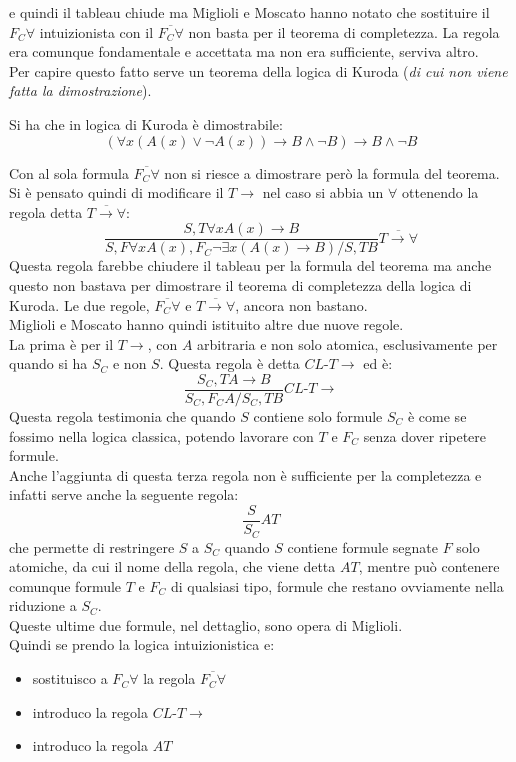 \documentclass[a4paper,12pt, oneside]{book}
\begin{document}
e quindi il tableau chiude ma Miglioli e Moscato hanno notato che sostituire il
$F_C\forall$ intuizionista con il $\overline{F_C\forall}$ non basta per il
teorema di completezza. La regola era comunque fondamentale e accettata ma non
era sufficiente, serviva altro.\\
Per capire questo fatto serve un teorema della logica di Kuroda (\textit{di cui
  non viene fatta la dimostrazione}).
\begin{teorema}
  Si ha che in logica di Kuroda è dimostrabile:
  \[(\forall x(A(x)\lor\neg A(x))\to B\land\neg B)\to B\land \neg B\]
\end{teorema}
Con al sola formula $\overline{F_C\forall}$ non si riesce a dimostrare però la
formula del teorema.\\
Si è pensato quindi di modificare il $T\to$ nel caso si abbia un $\forall$
ottenendo la regola detta $\overline{T\to\forall}$: 
\[\frac{S,T\forall xA(x)\to B}{S, F\forall x A(x), F_C\neg\exists x (A(x)\to B)/
    S, TB}\overline{T\to\forall}\]
Questa regola farebbe chiudere il tableau per la formula del teorema ma anche
questo non bastava per dimostrare il teorema di completezza della logica di
Kuroda. Le due regole, $\overline{F_C\forall}$ e $\overline{T\to\forall}$,
ancora non bastano.\\
Miglioli e Moscato hanno quindi istituito altre due nuove regole.\\
La prima è per il $T\to$, con $A$ arbitraria e non solo atomica, esclusivamente
per quando si ha $S_C$ e non $S$. Questa regola è detta $CL\mbox{-}T\to$ ed è:
\[\frac{S_C, TA\to B}{S_C, F_CA/S_C, TB}CL\mbox{-}T\to\]
Questa regola testimonia che quando $S$ contiene solo formule $S_C$ è come se
fossimo nella logica classica, potendo lavorare con $T$ e $F_C$ senza dover
ripetere formule.\\
Anche l'aggiunta di questa terza regola non è sufficiente per la completezza e
infatti serve anche la seguente regola:
\[\frac{S}{S_C}AT\]
che permette di restringere $S$ a $S_C$ quando $S$ contiene formule segnate
$F$ solo atomiche, da cui il nome della regola, che viene detta $AT$, mentre può
contenere comunque formule $T$ e $F_C$ di qualsiasi tipo, formule che restano
ovviamente nella riduzione a $S_C$.\\
Queste ultime due formule, nel dettaglio, sono opera di Miglioli. \\
Quindi se prendo la logica intuizionistica e:
\begin{itemize}
  \item sostituisco a $F_C\forall$ la regola $\overline{F_C\forall}$
  \item introduco la regola $CL\mbox{-}T\to$
  \item introduco la regola $AT$
\end{itemize}
\end{document}
